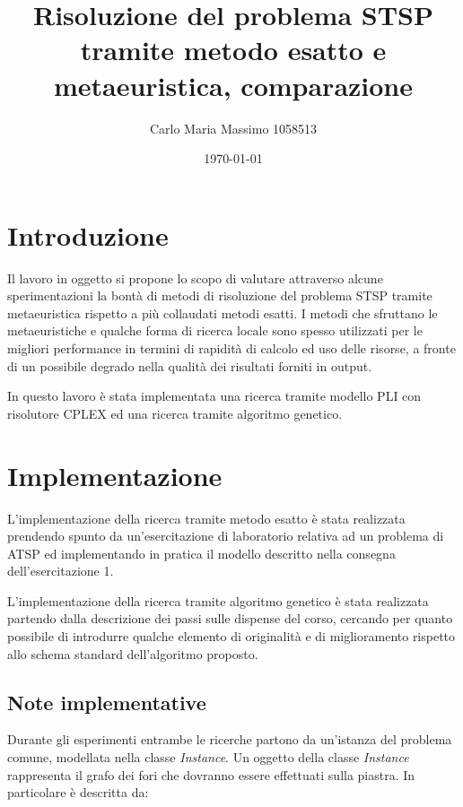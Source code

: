 \documentclass[a4paper]{article}
\begin{document}
\title{Risoluzione del problema STSP tramite metodo esatto e metaeuristica, comparazione}
\author{Carlo Maria Massimo 1058513}
\date{\today}
\maketitle

\tableofcontents

    \section{Introduzione}
        Il lavoro in oggetto si propone lo scopo di valutare attraverso alcune sperimentazioni la bont\`a di metodi
        di risoluzione del problema STSP tramite metaeuristica rispetto a pi\`u collaudati metodi esatti.
        I metodi che sfruttano le metaeuristiche e qualche forma di ricerca locale sono spesso utilizzati per le migliori
        performance in termini di rapidit\`a di calcolo ed uso delle risorse, a fronte di un possibile degrado nella qualit\`a
        dei risultati forniti in output.

        In questo lavoro \`e stata implementata una ricerca tramite modello PLI con risolutore CPLEX ed una ricerca tramite algoritmo genetico.

    \section{Implementazione}
        L'implementazione della ricerca tramite metodo esatto \`e stata realizzata prendendo spunto da un'esercitazione di laboratorio
        relativa ad un problema di ATSP ed implementando in pratica il modello descritto nella consegna dell'esercitazione 1.

        L'implementazione della ricerca tramite algoritmo genetico \`e stata realizzata partendo dalla descrizione dei passi
        sulle dispense del corso, cercando per quanto possibile di introdurre qualche elemento di originalit\`a e di miglioramento rispetto
        allo schema standard dell'algoritmo proposto.

        \subsection{Note implementative}
        Durante gli esperimenti entrambe le ricerche partono da un'istanza del problema comune, modellata nella classe \emph{Instance}.
        Un oggetto della classe \emph{Instance} rappresenta il grafo dei fori che dovranno essere effettuati sulla piastra.
        In particolare \`e descritta da:
\end{document}
